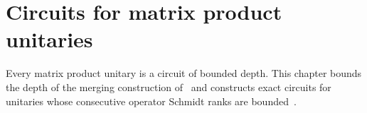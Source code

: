 \chapter{Circuits for matrix product unitaries}
\label{ch:mpu_circuits}

Every matrix product unitary is a circuit of bounded depth. This chapter bounds
the depth of the merging construction of~\cite{Styliaris2025MPUCircuits} and
constructs exact circuits for unitaries whose consecutive operator Schmidt
ranks are bounded~\cite{RankTwoMPUCircuits2026}.



